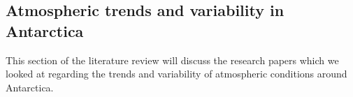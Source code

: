\subsection{Atmospheric trends and variability in Antarctica}
This section of the literature review will discuss the research papers which we looked at regarding the trends and variability of atmospheric conditions around Antarctica.